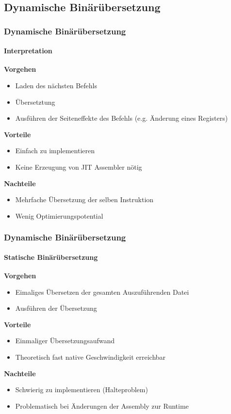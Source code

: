\subsection{Dynamische Binärübersetzung} %
\begin{frame}
    \frametitle{Dynamische Binärübersetzung}
    \framesubtitle{Interpretation}

    \textbf{Vorgehen}
    \begin{itemize}
        \item Laden des nächsten Befehls
        \item Übersetztung
        \item Ausführen der Seiteneffekte des Befehls (e.g. Änderung eines Registers)
    \end{itemize}

    \vspace{0.50cm}

    \textbf{Vorteile}
    \begin{itemize}
        \item Einfach zu implementieren
        \item Keine Erzeugung von JIT Assembler nötig
    \end{itemize}

    \vspace{0.50cm}

    \textbf{Nachteile}
    \begin{itemize}
        \item Mehrfache Übersetzung der selben Instruktion
        \item Wenig Optimierungspotential
    \end{itemize}
\end{frame}

\begin{frame}
    \frametitle{Dynamische Binärübersetzung}
    \framesubtitle{Statische Binärübersetzung}

    \textbf{Vorgehen}
    \begin{itemize}
        \item Eimaliges Übersetzen der gesamten Auszuführenden Datei
        \item Ausführen der Übersetzung
    \end{itemize}

    \vspace{0.50cm}

    \textbf{Vorteile}
    \begin{itemize}
        \item Einmaliger Übersetzungsaufwand
        \item Theoretisch fast native Geschwindigkeit erreichbar
    \end{itemize}

    \vspace{0.50cm}

    \textbf{Nachteile}
    \begin{itemize}
        \item Schwierig zu implementieren (Halteproblem)
        \item Problematisch bei Änderungen der Assembly zur Runtime
    \end{itemize}
\end{frame}

